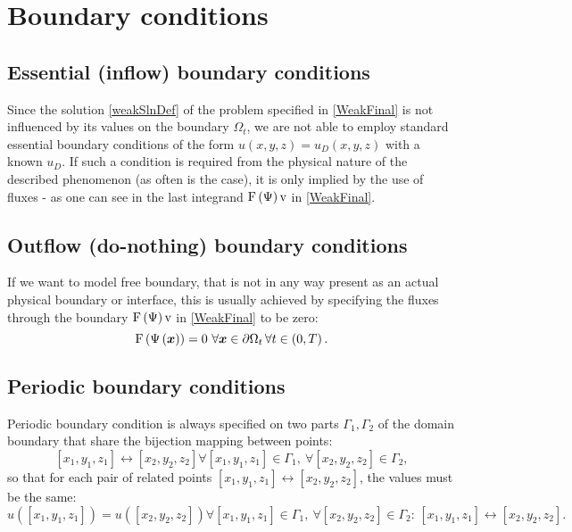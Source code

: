 \section{Boundary conditions}
\label{section:bcs}

\subsection{Essential (inflow) boundary conditions}

Since the solution \ref{weakSlnDef} of the problem specified in \ref{WeakFinal} is not influenced by its values on the boundary $\Omega_t$, we are not able to employ standard essential boundary conditions of the form $u\left(x, y, z\right) = u_D\left(x, y, z\right)$ with a known $u_D$.
If such a condition is required from the physical nature of the described phenomenon (as often is the case), it is only implied by the use of fluxes - as one can see in the last integrand $\mathrm{F}\left(\mathrm{\Psi}\right) \mathrm{v}$ in \ref{WeakFinal}.


\subsection{Outflow (do-nothing) boundary conditions}
If we want to model free boundary, that is not in any way present as an actual physical boundary or interface, this is usually achieved by specifying the fluxes through the boundary $\mathrm{F}\left(\mathrm{\Psi}\right) \mathrm{v}$ in \ref{WeakFinal} to be zero:
$$
\mathrm{F}\lo\mathrm{\Psi}\lo\bfx\ro\ro = 0\ \forall\bfx\in\partial\Omega_t\, \forall t\in \lo0, T\ro.
$$


\subsection{Periodic boundary conditions}
Periodic boundary condition is always specified on two parts $\Gamma_1, \Gamma_2$ of the domain boundary that share the bijection mapping between points:
$$
\left[x_1, y_1, z_1\right] \leftrightarrow \left[x_2, y_2, z_2\right] \forall \left[x_1, y_1, z_1\right] \in \Gamma_1,\ \forall \left[x_2, y_2, z_2\right] \in \Gamma_2,
$$
so that for each pair of related points $\left[x_1, y_1, z_1\right] \leftrightarrow \left[x_2, y_2, z_2\right]$, the values must be the same:
$$
u\left(\left[x_1, y_1, z_1\right]\right) = u\left(\left[x_2, y_2, z_2\right]\right) \forall \left[x_1, y_1, z_1\right] \in \Gamma_1,\ \forall \left[x_2, y_2, z_2\right] \in \Gamma_2:\, \left[x_1, y_1, z_1\right] \leftrightarrow \left[x_2, y_2, z_2\right].
$$

